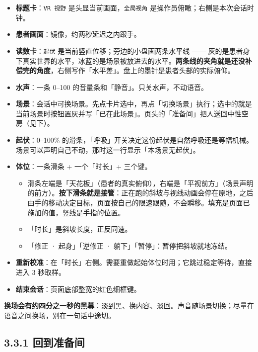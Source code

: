 \documentclass[
  chinese,
  letterpaper,
  DIV=11,
  numbers=noendperiod]{scrartcl}
\providecommand{\tightlist}{%
  \setlength{\itemsep}{0pt}\setlength{\parskip}{0pt}}
\begin{document}
\begin{itemize}
\tightlist
\item
  \textbf{标题卡}：\texttt{VR\ 视野} 是头显当前画面，\texttt{全局视角}
  是操作员俯瞰；右侧是本次会话时钟。
\item
  \textbf{患者画面}：镜像，约两秒延迟之内跟手。
\item
  \textbf{读数卡}：\texttt{起伏} 是当前竖直位移；旁边的小盘画两条水平线
  ------
  灰的是患者身下真实世界的水平，冰蓝的是场景被放进去的水平。\textbf{两条线的夹角就是还没补偿完的角度}，右侧写作「水平差」。盘上的墨针是患者头部的实际俯仰。
\item
  \textbf{水声}：一条 0--100 的音量条和「静音」。只关水声，不动语音。
\item
  \textbf{场景}：会话中可换场景。先点卡片选中，再点「切换场景」执行；选中的就是当前场景时按钮置灰并写「已在此场景」。页头的「准备间」把人送回中性空房（见下）。
\item
  \textbf{起伏}：0--100\%
  的滑条，「呼吸」开关决定这份起伏是自然呼吸还是等幅机械。场景可以声明自己不动，那时这一行显示「本场景无起伏」。
\item
  \textbf{体位}：一条滑条 + 一个「时长」+ 三个键。

  \begin{itemize}
  \tightlist
  \item
    滑条左端是「天花板」（患者的真实俯仰），右端是「平视前方」（场景声明的前方）。\textbf{按下滑条就是接管}：正在跑的斜坡与视线动画会停在原地，之后由手的移动决定目标，页面按自己的限速跟随，不会瞬移。填充是页面已施加的值，竖线是手指的位置。
  \item
    「时长」是斜坡长度，正反同速。
  \item
    「修正 · 起身」「逆修正 · 躺下」「暂停」：暂停把斜坡就地冻结。
  \end{itemize}
\item
  \textbf{重新校准}：在「时长」右侧。需要重做起始体位时用；它跳过稳定等待，直接进入
  3 秒取样。
\item
  \textbf{结束会话}：页面底部整宽的红色细框键。
\end{itemize}

\textbf{换场会有约四分之一秒的黑幕}：淡到黑、换内容、淡回。声音随场景切换；尽量在语音之间换场，别在一句话中途切。

\subsection{3.3.1 回到准备间}\label{ux56deux5230ux51c6ux5907ux95f4}
\end{document}
